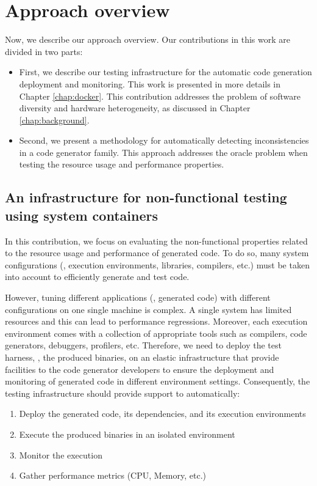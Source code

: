 \section{Approach overview}
\label{sec:cd_approach}
Now, we describe our approach overview. Our contributions in this work are divided in two parts:
\begin{itemize}
	\item First, we describe our testing infrastructure for the automatic code generation deployment and monitoring. This work is presented in more details in Chapter \ref{chap:docker}. This contribution addresses the problem of software diversity and hardware heterogeneity, as discussed in Chapter \ref{chap:background}.
	
	\item Second, we present a methodology for automatically detecting inconsistencies in a code generator family. This approach addresses the oracle problem when testing the resource usage and performance properties.
\end{itemize}


\subsection{An infrastructure for non-functional testing using system containers}
\label{sec:cg-An infrastructure for non-functional testing using system containers}
In this contribution, we focus on evaluating the non-functional properties related to the resource usage and performance of generated code. To do so, many system configurations (\ie, execution environments, libraries, compilers, etc.) must be taken into account to efficiently generate and test code. 

However, tuning different applications (\ie, generated code) with different configurations on one single machine is complex. A single system has limited resources and this can lead to performance regressions. Moreover, each execution environment comes with a collection of appropriate tools such as compilers, code generators, debuggers, profilers, etc. Therefore, we need to deploy the test harness, \ie, the produced binaries, on an elastic infrastructure that provide facilities to the code generator developers to ensure the deployment and monitoring of generated code in different environment settings. 
Consequently, the testing infrastructure should provide support to automatically:
\begin{enumerate}
	\item Deploy the generated code, its dependencies, and its execution environments
	\item Execute the produced binaries in an isolated environment 
	\item Monitor the execution 
	\item Gather performance metrics (CPU, Memory, etc.)
\end{enumerate}

